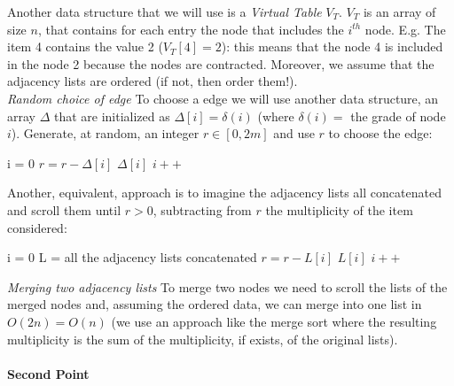 \documentclass[a4paper]{article}
\begin{document}
Another data structure that we will use is a \textit{Virtual Table} $V_T$. $V_T$ is an array of size $n$, that contains for each entry the node that includes the $i^{th}$ node. E.g. The item 4 contains the value 2 ($V_T[4] = 2$): this means that the node 4 is included in the node 2 because the nodes are contracted. Moreover, we assume that the adjacency lists are ordered (if not, then order them!). \\

\noindent
\textit{Random choice of edge}
To choose a edge we will use another data structure, an array $\Delta$ that are initialized as $\Delta[i] = \delta(i)$ (where $\delta(i) =$ the grade of node $i$). Generate, at random, an integer $r \in [0, 2m
]$ and use $r$ to choose the edge: 
\begin{algorithmic}
\State i = 0
		\State $r = r - \Delta[i]$
	\Else 
		\State {} $\Delta[i]$
	\EndIf
	\State $i++$
\EndWhile
\end{algorithmic}
Another, equivalent, approach is to imagine the adjacency lists all concatenated and scroll them until $r > 0$, subtracting from $r$ the multiplicity of the item considered:
\begin{algorithmic}
\State i = 0
\State L = all the adjacency lists concatenated
		\State $r = r - L[i]$
	\Else 
		\State {} $L[i]$
	\EndIf
	\State $i++$
\EndWhile
\end{algorithmic}

\noindent
\textit{Merging two adjacency lists}
To merge two nodes we need to scroll the lists of the merged nodes  and, assuming the ordered data, we can merge into one list in $O(2n) = O(n)$ (we use an approach like the merge sort where the resulting multiplicity is the sum of the multiplicity, if exists, of the original lists).
\\
\\

\noindent
\textbf{Second Point}
\\
\end{document}
